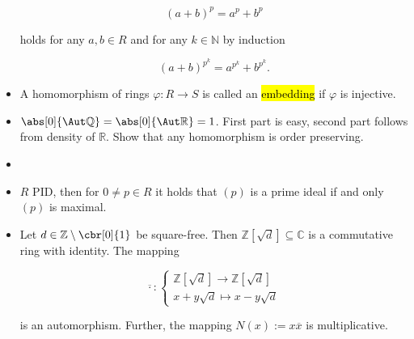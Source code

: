 \begin{itemize}
		\begin{equation}
			(a + b)^p = a^p + b^p
		\end{equation}

		\noindent holds for any $a,b \in R$ and for any $k \in \mathbb{N}$ by induction

		\begin{equation}
			(a + b)^{p^k} = a^{p^k} + b^{p^k}.
		\end{equation}

	\item A homomorphism of rings $\varphi: R \to S$ is called an \hl{embedding} if $\varphi$ is injective.

	\item $\abs[0]{\Aut \mathbb{Q}} = \abs[0]{\Aut \mathbb{R}} = 1$. First part is easy, second part follows from density of $\mathbb{R}$. Show that any homomorphism is order preserving.

	\item 
	\item $R$ PID, then for $0 \neq p \in R$ it holds that $(p)$ is a prime ideal if and only $(p)$ is maximal.

	\item Let $d \in \mathbb{Z} \setminus \cbr[0]{1}$ be square-free. Then $\mathbb{Z}[\sqrt{d}] \subseteq \mathbb{C}$ is a commutative ring with identity. The mapping 

		\begin{equation}
			\overline{\cdot}:\begin{cases}
				\mathbb{Z}[\sqrt{d}] \to \mathbb{Z}[\sqrt{d}]\\
				x + y\sqrt{d} \mapsto x - y\sqrt{d}
			\end{cases}
		\end{equation}

		\noindent is an automorphism. Further, the mapping $N(x) := x\overline{x}$ is multiplicative.

\end{itemize}
